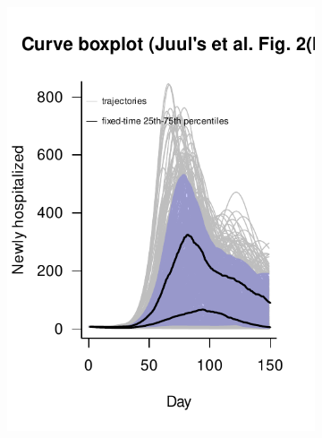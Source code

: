\documentclass[12pt]{article}
\theoremstyle{definition} %
\begin{document}
\begin{figure}[h!]
\centering
\begin{subfigure}[t]{.45\textwidth}
\centering
\includegraphics[width=\linewidth]{scripts/pix/fig2b_juul.pdf}
\caption{}\label{p.a}
\end{subfigure}
%
\begin{subfigure}[t]{.45\textwidth}
\centering

\end{subfigure}
\end{figure}
\end{document}
